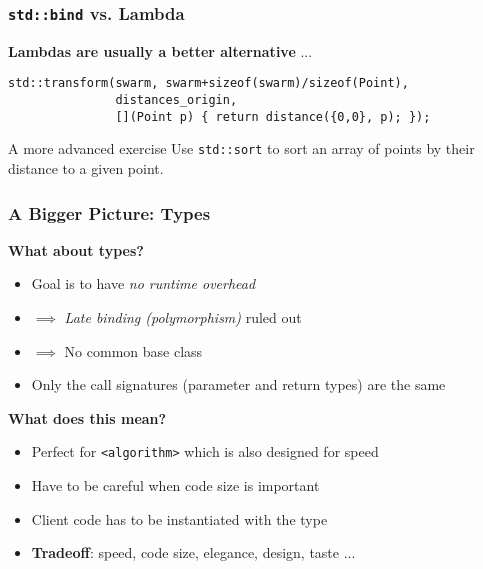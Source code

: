 \begin{frame}[fragile]
  \frametitle{\texttt{std::bind} vs. Lambda}

  \textbf{Lambdas are usually a better alternative} ...

  \begin{block}{}
\begin{verbatim}
std::transform(swarm, swarm+sizeof(swarm)/sizeof(Point), 
               distances_origin, 
               [](Point p) { return distance({0,0}, p); });
\end{verbatim}
  \end{block}

  \begin{block}{A more advanced exercise}
    Use \texttt{std::sort} to sort an array of points by their
    distance to a given point.
  \end{block}
  
\end{frame}

\begin{frame}[fragile]
  \frametitle{A Bigger Picture: Types}

  \textbf{What about types?}

  \begin{itemize}
  \item Goal is to have \textit{no runtime overhead}
  \item $\implies$ \textit{Late binding (polymorphism)} ruled out
  \item $\implies$ No common base class
  \item Only the call signatures (parameter and return types) are the
    same
  \end{itemize}

  \textbf{What does this mean?}

  \begin{itemize}
  \item Perfect for \texttt{<algorithm>} which is also designed for
    speed
  \item Have to be careful when code size is important
  \item Client code has to be instantiated with the type
  \item \textbf{Tradeoff}: speed, code size, elegance, design, taste
    ...
  \end{itemize}
    
\end{frame}
